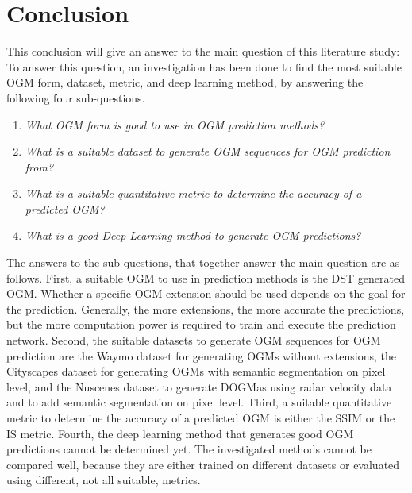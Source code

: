 \section{Conclusion} \label{sec:conclusion}
This conclusion will give an answer to the main question of this literature study:  
To answer this question, an investigation has been done to find the most suitable \gls{OGM} form, dataset, metric, and deep learning method, by answering the following four sub-questions. 

\begin{enumerate}
	\item \textit{What \gls{OGM} form is good to use in \gls{OGM} prediction methods?}
	\item \textit{What is a suitable dataset to generate \gls{OGM} sequences for \gls{OGM} prediction from?}
	\item \textit{What is a suitable quantitative metric to determine the accuracy of a predicted \gls{OGM}?}
	\item \textit{What is a good Deep Learning method to generate \gls{OGM} predictions?}	
\end{enumerate}

The answers to the sub-questions, that together answer the main question are as follows. First, a suitable \gls{OGM} to use in prediction methods is the \gls{DST} generated \gls{OGM}. Whether a specific \gls{OGM} extension should be used depends on the goal for the prediction. Generally, the more extensions, the more accurate the predictions, but the more computation power is required to train and execute the prediction network. Second, the suitable datasets to generate \gls{OGM} sequences for \gls{OGM} prediction are the Waymo \cite{sun2020scalability} dataset for generating \glspl{OGM} without extensions, the Cityscapes \cite{cordts2016cityscapes} dataset for generating \glspl{OGM} with semantic segmentation on pixel level, and the Nuscenes \cite{caesar2020nuscenes} dataset to generate \glspl{DOGMa} using radar velocity data and to add semantic segmentation on pixel level. Third, a suitable quantitative metric to determine the accuracy of a predicted \gls{OGM} is either the \gls{SSIM} or the \gls{IS} metric. Fourth, the deep learning method that generates good \gls{OGM} predictions cannot be determined yet. The investigated methods cannot be compared well, because they are either trained on different datasets or evaluated using different, not all suitable, metrics. 


